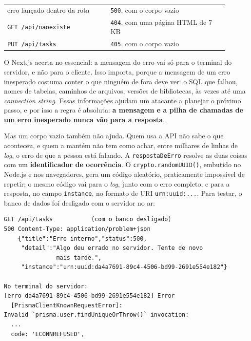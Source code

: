 \begin{center}
\begin{tabular}{@{}P{0.42\linewidth}P{0.48\linewidth}@{}}
\toprule
{}
 &  \\
\midrule
erro lançado dentro da rota & \texttt{500}, com o corpo vazio \\
 \texttt{GET /api/naoexiste} & \texttt{404}, com uma página HTML de 7 KB \\
\texttt{PUT /api/tasks} & \texttt{405}, com o corpo vazio \\
\bottomrule
\end{tabular}
\end{center}

O Next.js acerta no essencial: a mensagem do erro vai só para o terminal do servidor, e não para o cliente. Isso importa, porque a mensagem de um erro inesperado costuma conter o que ninguém de fora deve ver: o SQL que falhou, nomes de tabelas, caminhos de arquivos, versões de bibliotecas, às vezes até uma \textit{connection string}. Essas informações ajudam um atacante a planejar o próximo passo, e por isso a regra é absoluta: \textbf{a mensagem e a pilha de chamadas de um erro inesperado nunca vão para a resposta}.

Mas um corpo vazio também não ajuda. Quem usa a API não sabe o que aconteceu, e quem a mantém não tem como achar, entre milhares de linhas de \textit{log}, o erro de que a pessoa está falando. A \texttt{respostaDeErro} resolve as duas coisas com um \textbf{identificador de ocorrência}. O \texttt{crypto.randomUUID()}, embutido no Node.js e nos navegadores, gera um código aleatório, praticamente impossível de repetir; o mesmo código vai para o \textit{log}, junto com o erro completo, e para a resposta, no campo \texttt{instance}, no formato de URI \texttt{urn:uuid:...}. Para testar, o banco de dados foi desligado com o servidor no ar:

\begin{codigo}
\begin{Verbatim}[breaklines=true, breaksymbolleft={}, fontsize=\footnotesize]
GET /api/tasks           (com o banco desligado)
500 Content-Type: application/problem+json
    {"title":"Erro interno","status":500,
     "detail":"Algo deu errado no servidor. Tente de novo
               mais tarde.",
     "instance":"urn:uuid:da4a7691-89c4-4506-bd99-2691e554e182"}

No terminal do servidor:
[erro da4a7691-89c4-4506-bd99-2691e554e182] Error
  [PrismaClientKnownRequestError]:
Invalid `prisma.user.findUniqueOrThrow()` invocation:
  ...
  code: 'ECONNREFUSED',
\end{Verbatim}
\end{codigo}

